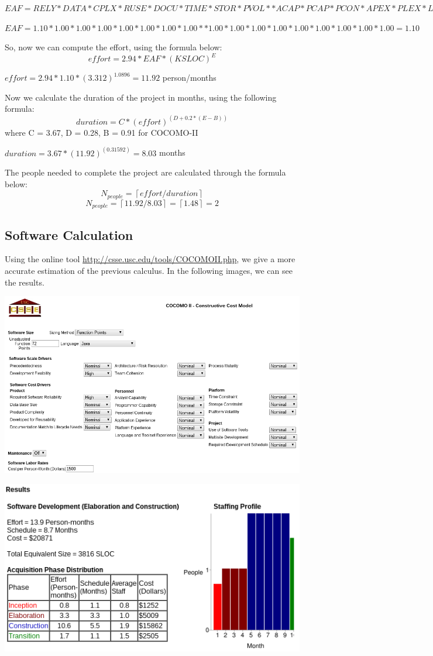 	\begin{center}
		$EAF=RELY*DATA*CPLX*RUSE*DOCU*TIME*STOR*PVOL*
		*ACAP*PCAP*PCON*APEX*PLEX*LTEX*TOOL*SITE*SCED$
	\end{center}
	\begin{center}
		$EAF=1.10*1.00*1.00*1.00*1.00*1.00*1.00*1.00*
		*1.00*1.00*1.00*1.00*1.00*1.00*1.00*1.00*1.00=1.10$
	\end{center}
	So, now we can compute the effort, using the formula below:
	$$effort=2.94*EAF*(KSLOC)^E$$
	\begin{center}
		$effort=2.94*1.10*(3.312)^1.0896 = 11.92$ person/months
	\end{center}
	Now we calculate the duration of the project in months, using the following formula:
	$$duration = C*(effort)^{(D+0.2*(E-B))}$$ where C = 3.67, D = 0.28, B = 0.91 for COCOMO-II
	\begin{center}
		$duration = 3.67*(11.92)^(0.31592) = 8.03$ months
	\end{center}

	
	\noindent The people needed to complete the project are calculated through the formula below:
	$$N_{people} = \left \lceil{effort/duration}\right \rceil $$
	$$N_{people} = \left \lceil{11.92/8.03}\right \rceil = \left \lceil{1.48}\right \rceil = 2$$
	
	\newpage
	\subsection{Software Calculation}
	Using the online tool \url{http://csse.usc.edu/tools/COCOMOII.php}, we give a more accurate estimation of the previous calculus. In the following images, we can see the results.  
	
	\begin{center}
			\includegraphics[width=1\textwidth]{./images/cocomo1.png}
	\end{center}
	
	\begin{center}
			\includegraphics[width=1\textwidth]{./images/cocomo2.png}
	\end{center}
	 